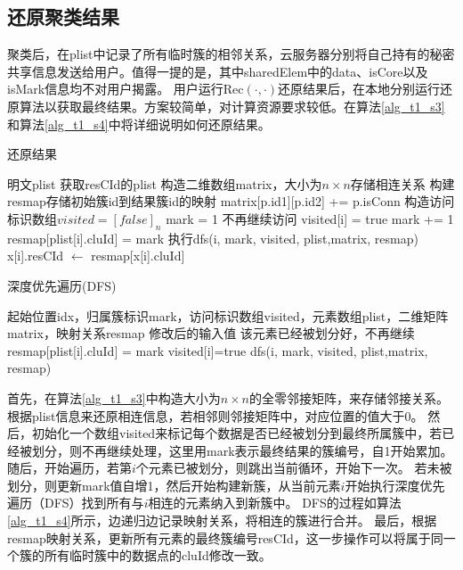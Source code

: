 \subsection{还原聚类结果}
\label{task1-huanyuan}
聚类后，在plist中记录了所有临时簇的相邻关系，云服务器分别将自己持有的秘密共享信息发送给用户。值得一提的是，其中sharedElem中的data、isCore以及isMark信息均不对用户揭露。
用户运行$ \text{Rec}(\cdot,\cdot) $还原结果后，在本地分别运行还原算法以获取最终结果。方案较简单，对计算资源要求较低。在算法\ref{alg_t1_s3}和算法\ref{alg_t1_s4}中将详细说明如何还原结果。

\begin{algorithm}[htbp]
	\renewcommand{\algorithmicrequire}{\textbf{输入:}}
	\renewcommand{\algorithmicensure}{\textbf{输出:}}
	\caption{还原结果}
	\label{alg_t1_s3}
	\begin{algorithmic}[1]
		\REQUIRE 明文plist
		\ENSURE 获取resCId的plist
		\STATE 构造二维数组matrix，大小为$ n\times n $存储相连关系
		\STATE 构建resmap存储初始簇id到结果簇id的映射
		\STATE matrix[p.id1][p.id2] += p.isConn
		\ENDFOR
		\STATE 构造访问标识数组$ visited=[false]_n $
		\STATE mark = 1
		\STATE 不再继续访问
		\ENDIF
		\STATE visited[i] = true
		\STATE mark += 1
		\STATE resmap[plist[i].cluId] = mark
		\STATE 执行dfs(i, mark, visited, plist,matrix, resmap)
		\ENDFOR
		\STATE x[i].resCId $\leftarrow$ resmap[x[i].cluId]
		\ENDIF
		\ENDFOR
	\end{algorithmic}
\end{algorithm}

\begin{algorithm}[htbp]
	\renewcommand{\algorithmicrequire}{\textbf{输入:}}
	\renewcommand{\algorithmicensure}{\textbf{输出:}}
	\caption{深度优先遍历(DFS)}
	\label{alg_t1_s4}
	\begin{algorithmic}[1]
		\REQUIRE 起始位置idx，归属簇标识mark，访问标识数组visited，元素数组plist，二维矩阵matrix，映射关系resmap
		\ENSURE 修改后的输入值
		\STATE 该元素已经被划分好，不再继续
		\ENDIF
		\STATE resmap[plist[i].cluId] = mark
		\STATE visited[i]=true
		\STATE dfs(i, mark, visited, plist,matrix, resmap)
		\ENDIF
		\ENDFOR
	\end{algorithmic}
\end{algorithm}

首先，在算法\ref{alg_t1_s3}中构造大小为$ n \times n $的全零邻接矩阵，来存储邻接关系。
根据plist信息来还原相连信息，若相邻则邻接矩阵中，对应位置的值大于0。
然后，初始化一个数组visited来标记每个数据是否已经被划分到最终所属簇中，若已经被划分，则不再继续处理，这里用mark表示最终结果的簇编号，自1开始累加。
随后，开始遍历，若第$ i $个元素已被划分，则跳出当前循环，开始下一次。
若未被划分，则更新mark值自增1，然后开始构建新簇，从当前元素$ i $开始执行深度优先遍历（DFS）找到所有与$ i $相连的元素纳入到新簇中。
DFS的过程如算法\ref{alg_t1_s4}所示，边递归边记录映射关系，将相连的簇进行合并。
最后，根据resmap映射关系，更新所有元素的最终簇编号resCId，这一步操作可以将属于同一个簇的所有临时簇中的数据点的cluId修改一致。

